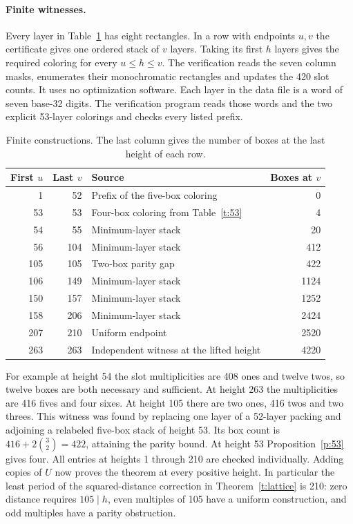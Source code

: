 \documentclass[11pt]{article}
\begin{document}
\paragraph{Finite witnesses.}
Every layer in Table~\ref{t:prefix} has eight rectangles. In a row with endpoints $u,v$ the certificate gives one ordered stack of $v$ layers. Taking its first $h$ layers gives the required coloring for every $u\le h\le v$. The verification reads the seven column masks, enumerates their monochromatic rectangles and updates the 420 slot counts. It uses no optimization software. Each layer in the data file is a word of seven base-32 digits. The verification program reads those words and the two explicit 53-layer colorings and checks every listed prefix.

\begin{table}[ht]\centering
\caption{Finite constructions. The last column gives the number of boxes at the last height of each row.}\label{t:prefix}
\begin{tabular}{rrl r}\toprule
First $u$ & Last $v$ & Source & Boxes at $v$\\\midrule
1&52&Prefix of the five-box coloring&0\\
53&53&Four-box coloring from Table~\ref{t:53}&4\\
54&55&Minimum-layer stack&20\\
56&104&Minimum-layer stack&412\\
105&105&Two-box parity gap&422\\
106&149&Minimum-layer stack&1124\\
150&157&Minimum-layer stack&1252\\
158&206&Minimum-layer stack&2424\\
207&210&Uniform endpoint&2520\\
263&263&Independent witness at the lifted height&4220\\
\bottomrule\end{tabular}
\end{table}

For example at height 54 the slot multiplicities are 408 ones and twelve twos, so twelve boxes are both necessary and sufficient. At height 263 the multiplicities are 416 fives and four sixes. At height 105 there are two ones, 416 twos and two threes. This witness was found by replacing one layer of a 52-layer packing and adjoining a relabeled five-box stack of height 53. Its box count is $416+2\binom32=422$, attaining the parity bound. At height 53 Proposition~\ref{p:53} gives four. All entries at heights 1 through 210 are checked individually. Adding copies of $U$ now proves the theorem at every positive height. In particular the least period of the squared-distance correction in Theorem~\ref{t:lattice} is 210: zero distance requires $105\mid h$, even multiples of 105 have a uniform construction, and odd multiples have a parity obstruction.
\end{document}
